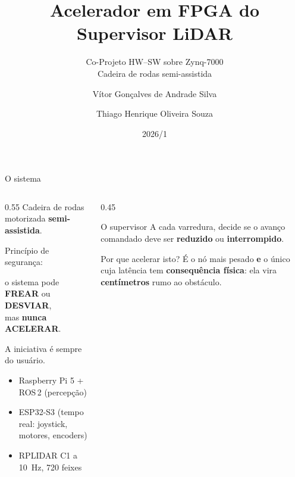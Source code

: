 \documentclass[aspectratio=169, 11pt]{beamer}
\title{Acelerador em FPGA do Supervisor LiDAR}
\subtitle{Co-Projeto HW--SW sobre Zynq-7000 \\ \small Cadeira de rodas semi-assistida}
\author{Vítor Gonçalves de Andrade Silva \and Thiago Henrique Oliveira Souza}
\institute{Engenharia Eletrônica --- FCTE/UnB}
\date{2026/1}
\begin{document}
\maketitle

\begin{frame}{O sistema}
\begin{columns}[T]
\begin{column}{0.55\textwidth}
Cadeira de rodas motorizada \textbf{semi-assistida}.

\vspace{4mm}
\alert{Princípio de segurança:}
\begin{center}
\large o sistema pode \textbf{FREAR} ou \textbf{DESVIAR},\\
mas \textbf{nunca ACELERAR}.
\end{center}
\vspace{2mm}
A iniciativa é sempre do usuário.

\vspace{4mm}
\footnotesize
\begin{itemize}
\item Raspberry Pi 5 + ROS\,2 (percepção)
\item ESP32-S3 (tempo real: joystick, motores, encoders)
\item RPLIDAR C1 a \SI{10}{\hertz}, \num{720} feixes
\end{itemize}
\end{column}
\begin{column}{0.45\textwidth}
\begin{block}{O supervisor}
A cada varredura, decide se o avanço comandado deve ser \textbf{reduzido} ou
\textbf{interrompido}.
\end{block}
\vspace{2mm}
\begin{alertblock}{Por que acelerar isto?}
É o nó mais pesado \textbf{e} o único cuja latência tem \textbf{consequência
física}: ela vira \textbf{centímetros} rumo ao obstáculo.
\end{alertblock}
\end{column}
\end{columns}
\end{frame}
\end{document}
